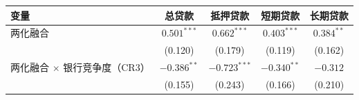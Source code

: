 {\scriptsize
\begin{center}
\begin{tabular}{lcccc}
  \toprule
  变量 & 总贷款 & 抵押贷款 & 短期贷款 & 长期贷款 \\
  \midrule
  两化融合 & $0.501^{***}$ & $0.662^{***}$ & $0.403^{***}$ & $0.384^{**}$ \\
           & (0.120) & (0.179) & (0.119) & (0.162) \\
  两化融合 $\times$ 银行竞争度（CR3） & $-0.386^{**}$ & $-0.723^{***}$ & $-0.340^{**}$ & $-0.312$ \\
                                      & (0.155) & (0.243) & (0.166) & (0.210) \\
  \bottomrule
\end{tabular}
\end{center}
}
